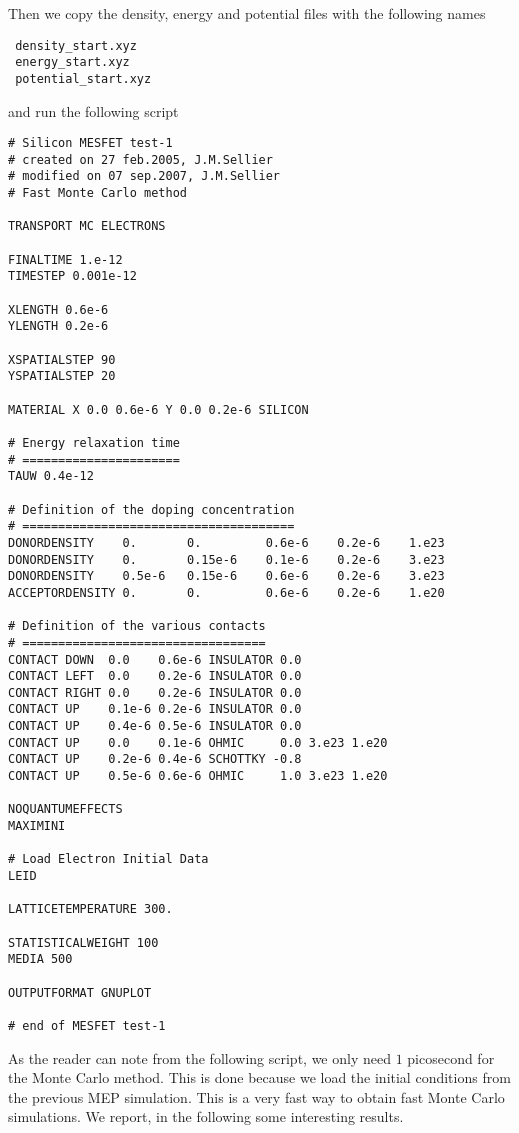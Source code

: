 \documentclass[12pt]{book}
\begin{document}
Then we copy the density, energy and potential files with the following names
\begin{verbatim}
 density_start.xyz
 energy_start.xyz
 potential_start.xyz
\end{verbatim}
and run the following script
\begin{verbatim}
# Silicon MESFET test-1
# created on 27 feb.2005, J.M.Sellier
# modified on 07 sep.2007, J.M.Sellier
# Fast Monte Carlo method

TRANSPORT MC ELECTRONS

FINALTIME 1.e-12
TIMESTEP 0.001e-12

XLENGTH 0.6e-6
YLENGTH 0.2e-6

XSPATIALSTEP 90
YSPATIALSTEP 20

MATERIAL X 0.0 0.6e-6 Y 0.0 0.2e-6 SILICON

# Energy relaxation time
# ======================
TAUW 0.4e-12

# Definition of the doping concentration
# ======================================
DONORDENSITY    0.       0.         0.6e-6    0.2e-6    1.e23
DONORDENSITY    0.       0.15e-6    0.1e-6    0.2e-6    3.e23
DONORDENSITY    0.5e-6   0.15e-6    0.6e-6    0.2e-6    3.e23
ACCEPTORDENSITY 0.       0.         0.6e-6    0.2e-6    1.e20

# Definition of the various contacts
# ==================================
CONTACT DOWN  0.0    0.6e-6 INSULATOR 0.0
CONTACT LEFT  0.0    0.2e-6 INSULATOR 0.0
CONTACT RIGHT 0.0    0.2e-6 INSULATOR 0.0
CONTACT UP    0.1e-6 0.2e-6 INSULATOR 0.0
CONTACT UP    0.4e-6 0.5e-6 INSULATOR 0.0
CONTACT UP    0.0    0.1e-6 OHMIC     0.0 3.e23 1.e20
CONTACT UP    0.2e-6 0.4e-6 SCHOTTKY -0.8
CONTACT UP    0.5e-6 0.6e-6 OHMIC     1.0 3.e23 1.e20

NOQUANTUMEFFECTS
MAXIMINI

# Load Electron Initial Data
LEID

LATTICETEMPERATURE 300.

STATISTICALWEIGHT 100
MEDIA 500

OUTPUTFORMAT GNUPLOT

# end of MESFET test-1

\end{verbatim}
As the reader can note from the following script, we only need $1$ picosecond for the Monte Carlo method. This is done because we load the initial conditions from the previous MEP simulation. This is a very fast way to obtain fast Monte Carlo simulations.
We report, in the following some interesting results.
\end{document}
